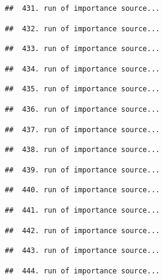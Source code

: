 \documentclass[
]{article}
\begin{document}
\begin{verbatim}
##  431. run of importance source...
\end{verbatim}

\begin{verbatim}
##  432. run of importance source...
\end{verbatim}

\begin{verbatim}
##  433. run of importance source...
\end{verbatim}

\begin{verbatim}
##  434. run of importance source...
\end{verbatim}

\begin{verbatim}
##  435. run of importance source...
\end{verbatim}

\begin{verbatim}
##  436. run of importance source...
\end{verbatim}

\begin{verbatim}
##  437. run of importance source...
\end{verbatim}

\begin{verbatim}
##  438. run of importance source...
\end{verbatim}

\begin{verbatim}
##  439. run of importance source...
\end{verbatim}

\begin{verbatim}
##  440. run of importance source...
\end{verbatim}

\begin{verbatim}
##  441. run of importance source...
\end{verbatim}

\begin{verbatim}
##  442. run of importance source...
\end{verbatim}

\begin{verbatim}
##  443. run of importance source...
\end{verbatim}

\begin{verbatim}
##  444. run of importance source...
\end{verbatim}
\end{document}
